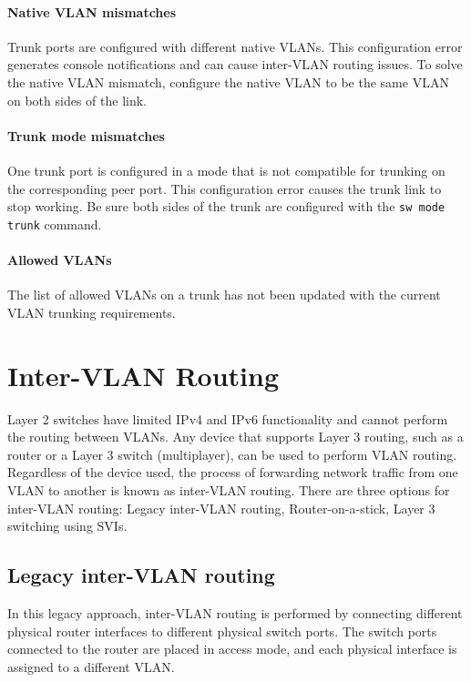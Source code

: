\paragraph{Native VLAN mismatches} Trunk ports are configured with different native VLANs. This configuration error generates console notifications and can cause inter-VLAN routing issues. To solve the native VLAN mismatch, configure the native VLAN to be the same VLAN on both sides of the link.

\paragraph{Trunk mode mismatches} One trunk port is configured in a mode that is not compatible for trunking on the corresponding peer port. This configuration error causes the trunk link to stop working. Be sure both sides of the trunk are configured with the \verb|sw mode trunk| command. 

\paragraph{Allowed VLANs} The list of allowed VLANs on a trunk has not been updated with the current VLAN trunking requirements. 

\section{Inter-VLAN Routing}

Layer 2 switches have limited IPv4 and IPv6 functionality and cannot perform the routing between VLANs. Any device that supports Layer 3 routing, such as a router or a Layer 3 switch (multiplayer), can be used to perform VLAN routing. Regardless of the device used, the process of forwarding network traffic from one VLAN to another is known as inter-VLAN routing. There are three options for inter-VLAN routing: Legacy inter-VLAN routing, Router-on-a-stick, Layer 3 switching using SVIs.

\subsection{Legacy inter-VLAN routing}

In this legacy approach, inter-VLAN routing is performed by connecting different physical router interfaces to different physical switch ports. The switch ports connected to the router are placed in access mode, and each physical interface is assigned to a different VLAN.

